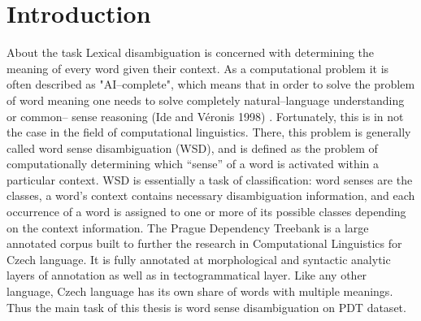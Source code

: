 \chapter{Introduction}

\begin{section}{About the task}
Lexical disambiguation is concerned with determining the meaning of every word given their context. As a computational problem it is often described as "AI--complete", which means that in order to solve the problem of word meaning one needs to solve completely  natural--language understanding or common-- sense reasoning (Ide and V\'eronis 1998)
. Fortunately, this is in not the case in the field of computational linguistics. There, this problem is generally called word sense disambiguation (WSD), and is defined as the problem of computationally determining which ``sense'' of a word is activated within a particular context. WSD is essentially a task of classification: word senses are the classes, a word's context contains necessary disambiguation information, and each occurrence of a word is assigned to one or more of its possible classes depending on the context information.
\newline
\newline The Prague Dependency Treebank is a large annotated corpus built to further the research in Computational Linguistics for Czech language. It is fully annotated at morphological and syntactic analytic  layers of annotation as well as in tectogrammatical layer. Like any other language, Czech language has its own share of words with multiple meanings. Thus the main task of this thesis is word sense disambiguation on PDT dataset. 
\end{section}
